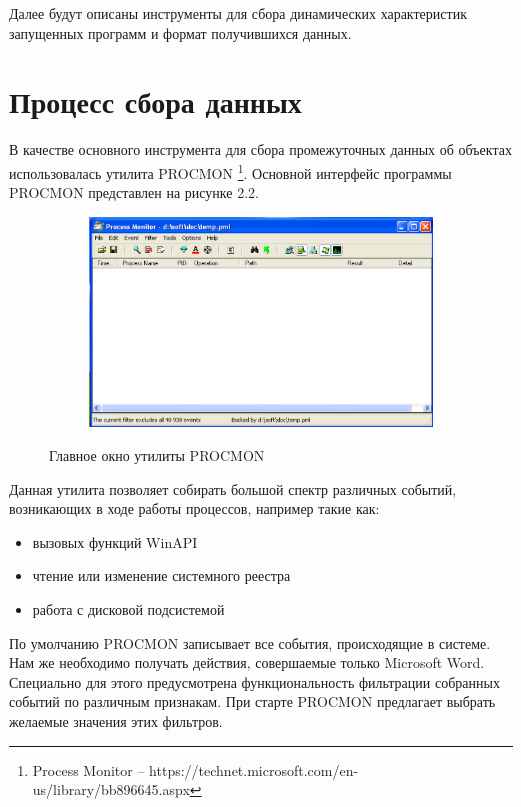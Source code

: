 Далее будут описаны инструменты для сбора динамических характеристик запущенных программ и формат получившихся данных.

\section{Процесс сбора данных}

В качестве основного инструмента для сбора промежуточных данных об объектах использовалась утилита PROCMON \footnote{Process Monitor -- https://technet.microsoft.com/en-us/library/bb896645.aspx}.
Основной интерфейс программы PROCMON представлен на рисунке 2.2.

\newpage
\begin{figure}[ht]
	\centering
    \begin{subfigure}[b]{1\textwidth}
    \centering
        \includegraphics[scale=0.5]{procmon_main_window.png}        
    \end{subfigure}
 
    \caption{Главное окно утилиты PROCMON}
    \label{fig_parsetree}
\end{figure}

Данная утилита позволяет собирать большой спектр различных событий, возникающих в ходе работы процессов, например такие как:
\begin{itemize}
\item вызовых функций WinAPI
\item чтение или изменение системного реестра
\item работа с дисковой подсистемой
\end{itemize}

По умолчанию PROCMON записывает все события, происходящие в системе. 
Нам же необходимо получать действия, совершаемые только Microsoft Word.
Специально для этого предусмотрена функциональность фильтрации собранных событий по различным признакам.
При старте PROCMON предлагает выбрать желаемые значения этих фильтров.

